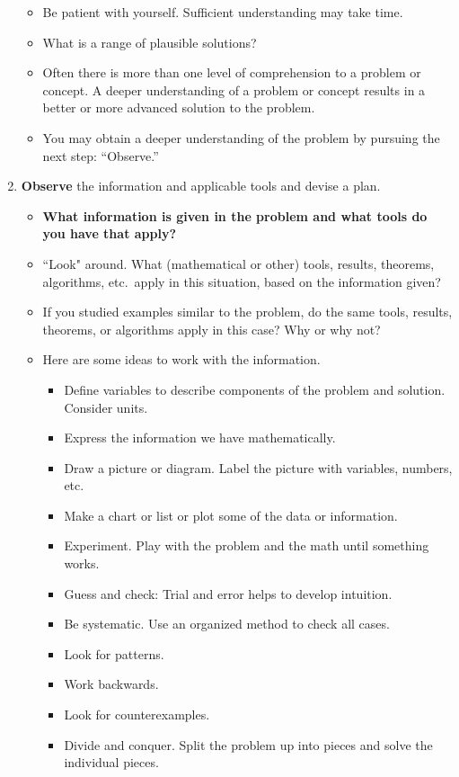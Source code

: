 \begin{enumerate}
\begin{itemize}
    \item Be patient with yourself. Sufficient understanding may take time.
    \item What is a range of plausible solutions?
    \item Often there is more than one level of comprehension to a problem or concept. A deeper understanding of a problem or concept results in a better or more advanced solution to the problem.
    \item You may obtain a deeper understanding of the problem by pursuing the next step: ``Observe.''
\end{itemize}
\item {\bf Observe} the information and applicable tools and devise a plan.
\begin{itemize}
    \item {\bf What information is given in the problem and what tools do you have that apply?}
    \item ``Look" around. What (mathematical or other) tools, results, theorems, algorithms, etc.\ apply in this situation, based on the information given?
    \item If you studied examples similar to the problem, do the same tools, results, theorems, or algorithms apply in this case? Why or why not?
    \item Here are some ideas to work with the information.
    \begin{itemize}
        \item Define variables to describe components of the problem and solution. Consider units.
        \item Express the information we have mathematically.
        \item Draw a picture or diagram. Label the picture with variables, numbers, etc.
        \item Make a chart or list or plot some of the data or information.
        \item Experiment. Play with the problem and the math until something works.
        \item Guess and check: Trial and error helps to develop intuition.
        \item Be systematic. Use an organized method to check all cases.
        \item Look for patterns.
        \item Work backwards.
        \item Look for counterexamples.
        \item Divide and conquer. Split the problem up into pieces and solve the individual pieces.

\end{itemize}
\end{itemize}
\end{enumerate}
